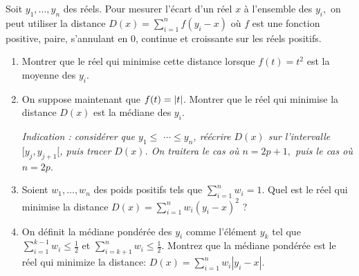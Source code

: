 \documentclass{../headers/td_upc}
\providecommand{\1}{\mathds{1}}
\begin{document}
	
	\cor{\newpage}
	
	\exo{\!\!\!\!*} 
	Soit $y_{1}, \ldots, y_{n}$ des réels. Pour mesurer l'écart d'un réel $x$ à l'ensemble des $y_{i},$ on peut utiliser la distance $D(x)=\sum_{i=1}^{n} f\left(y_{i}-x\right)$ où $f$ est une fonction positive, paire, s'annulant en 0, continue et croissante sur les réels positifs.
	\begin{enumerate}
		\item Montrer que le réel qui minimise cette distance lorsque $f(t)=t^{2}$ est la moyenne des $y_{i}$.
		\item On suppose maintenant que $f(t)=\left\lvert t\right\rvert$. Montrer que le réel qui minimise la distance $D(x)$ est la médiane des $y_{i}$.
		
		{\it Indication : considérer que $y_{1} \leq$ $\cdots \leq y_{n}$, réécrire $D(x)$ sur l'intervalle $[y_{j}, y_{j+1}[$, puis tracer $D(x)$.
		On traitera le cas où $n=2 p+1,$ puis le cas où $n=2 p$}.
		
		
		\item Soient $w_{1}, \ldots, w_{n}$ des poids positifs tels que $\sum_{i=1}^n w_i = 1$.
		Quel est le réel qui minimise la distance 
		\(
		D(x) = \sum_{i=1}^n w_i (y_i - x)^2
		\) ?
		\item On définit la médiane pondérée des $y_i$ comme l'élément $y_k$ tel que
		\(
		\sum_{i=1}^{k-1} w_i \leq \frac{1}{2}
		\)
		et
		\(
		\sum_{i=k+1}^n w_i \leq \frac{1}{2}.
		\)
		Montrez que la médiane pondérée est le réel qui minimize la distance\;:
		\(
		D(x) = \sum_{i=1}^n w_i |y_i - x|
		\).
	\end{enumerate}
	
\end{document}
